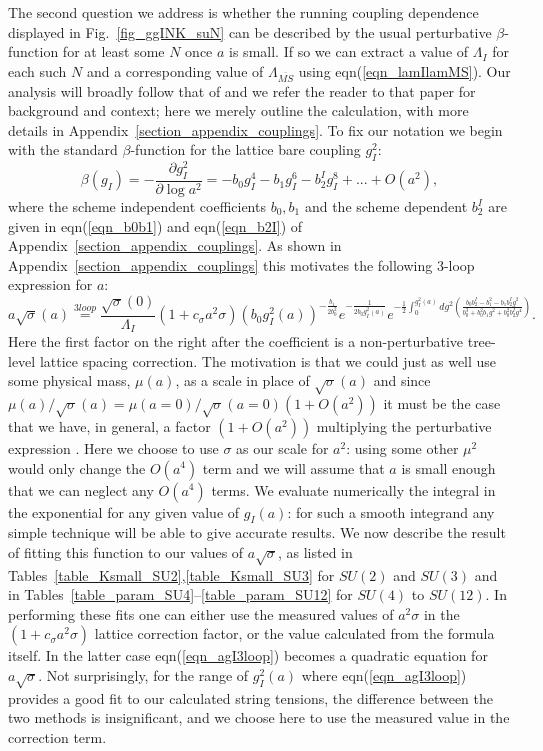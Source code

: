 \documentclass[12pt]{article}
\newcommand{\be}{\begin{equation}}
\newcommand{\ee}{\end{equation}}
\begin{document}
The second question we address is whether the running coupling dependence displayed in 
Fig.~\ref{fig_ggINK_suN} can be described by the usual perturbative $\beta$-function
for at least some $N$ once $a$ is small. If so we can extract a value of $\Lambda_I$
for each such $N$ and a corresponding value of $\Lambda_{\overline{MS}}$ using
eqn(\ref{eqn_lamIlamMS}). Our analysis will broadly follow that of
%
\cite{CAMTAT}
%
and we refer the reader to that paper for background and context; here we merely outline
the calculation, with more details in Appendix~\ref{section_appendix_couplings}. To fix
our notation we begin with the standard $\beta$-function for the lattice bare coupling $g_I^2$:
%
\be
\beta(g_I) = -\frac{\partial g^2_I}{\partial\log a^2}
=
- b_0  g^4_I - b_1  g^6_I - b^I_2  g^8_I + ...
+ O(a^2),
\label{eqn_bfunction}
\ee
%
where the scheme independent coefficients $b_0,b_1$ and the scheme dependent $b^I_2$
are given in eqn(\ref{eqn_b0b1}) and eqn(\ref{eqn_b2I}) of
Appendix~\ref{section_appendix_couplings}.
As shown in Appendix~\ref{section_appendix_couplings} this motivates the following
3-loop  expression for $a$:
%
\be
a \sqrt\sigma(a)
\stackrel{3 loop}{=} 
\frac{\sqrt\sigma(0)}{\Lambda_I}
\left( 1 + c_{\sigma} a^2\sigma \right) 
\left(b_0g_I^2(a)\right)^{-\frac{b_1}{2b^2_0}}
e^{-\frac{1}{2b_0g_I^2(a)}}
e^{-\frac{1}{2} \int^{g_I^2(a)}_0 dg^2
\left(\frac{b_0b^I_2-b^2_1-b_1b^I_2g^2}{b^3_0+b^2_0b_1g^2+b^2_0b^I_2g^4}
\right) }.
\label{eqn_agI3loop}
\ee
%
Here the first factor on the right after the coefficient is a non-perturbative tree-level lattice
spacing correction.
The motivation is that we could just as well use some physical mass, $\mu(a)$, as a scale in place of
$\surd\sigma(a)$ and since $\mu(a)/\surd\sigma(a)=\mu(a=0)/\surd\sigma(a=0)(1+O(a^2))$ it
must be the case that we have, in general, a factor $(1+O(a^2))$ multiplying the perturbative expression
%
\cite{CAMTAT,CAMTAT2}.
%
Here we choose to use $\sigma$ as our scale for $a^2$: using some other $\mu^2$ would only change
the $O(a^4)$ term and we will assume that $a$ is small enough that we can neglect any $O(a^4)$ terms.
We evaluate numerically the integral in the exponential for any given value of $g_I(a)$:
for such a smooth integrand any simple technique will be able to give accurate results.
We now describe the result of fitting this function to our values of $a\surd\sigma$, as listed in
Tables~\ref{table_Ksmall_SU2},\ref{table_Ksmall_SU3} for $SU(2)$ and $SU(3)$ and in
Tables~\ref{table_param_SU4}--\ref{table_param_SU12} for $SU(4)$ to $SU(12)$.
In performing these fits one can either use the measured values of $a^2\sigma$ in the
$(1+c_{\sigma}a^2\sigma)$ lattice correction factor, or the value calculated from the
formula itself. In the latter case eqn(\ref{eqn_agI3loop}) becomes a quadratic equation
for $a\surd\sigma$. Not surprisingly, for the range of $g_I^2(a)$ where  eqn(\ref{eqn_agI3loop})
provides a good fit to our calculated string tensions, the difference between the
two methods is insignificant, and we choose here to use the measured value in the correction term.
\end{document}
